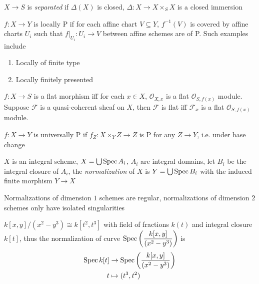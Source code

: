 \documentclass[main]{subfiles}
\begin{document}
\begin{definition}
$X\to S$ is \textit{separated} if $\Delta(X)$ is closed, $\Delta:X\to X\times_SX$ is a closed immersion
\end{definition}

\begin{definition}
$f:X\to Y$ is locally P if for each affine chart $V\subseteq Y$, $f^{-1}(V)$ is covered by affine charts $U_i$ such that $f|_{U_i}:U_i\to V$ between affine schemes are of P. Such examples include
\begin{enumerate}
\item Locally of finite type
\item Locally finitely presented
\end{enumerate}
\end{definition}

\begin{definition}
$f:X\to S$ is a flat morphism iff for each $x\in X$, $\mathcal O_{X,x}$ is a flat $\mathcal O_{S,f(x)}$ module. Suppose $\mathcal F$ is a quasi-coherent sheaf on $X$, then $\mathcal F$ is flat iff $\mathcal F_x$ is a flat $\mathcal O_{S,f(x)}$ module.
\end{definition}

\begin{definition}
$f:X\to Y$ is universally P if $f_Z:X\times_YZ\to Z$ is P for any $Z\to Y$, i.e. under base change
\end{definition}

\begin{definition}
$X$ is an integral scheme, $X=\bigcup\operatorname{Spec} A_i$, $A_i$ are integral domains, let $B_i$ be the integral closure of $A_i$, the \textit{normalization} of $X$ is $Y=\bigcup\operatorname{Spec} B_i$ with the induced finite morphism $Y\to X$
\end{definition}

\begin{lemma}
Normalizations of dimension $1$ schemes are regular, normalizations of dimension $2$ schemes only have isolated singularities
\end{lemma}

\begin{example}
$k[x,y]/(x^2-y^3)\cong k[t^2,t^3]$ with field of fractions $k(t)$ and integral closure $k[t]$, thus the normalization of curve $\operatorname{Spec}\left(\dfrac{k[x,y]}{(x^2-y^3)}\right)$ is
\begin{align*}
\operatorname{Spec} k[t]&\to\operatorname{Spec}\left(\dfrac{k[x,y]}{(x^2-y^3)}\right) \\
t&\mapsto (t^3,t^2)
\end{align*}
\end{example}
\end{document}
